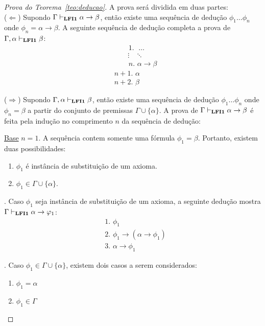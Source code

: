     \begin{proof}[Prova do Teorema~\ref{teo:deducao}] A prova será dividida em duas partes:\\
        ($\Longleftarrow$) Supondo $\Gamma \vdash_{\textbf{LFI1}{}} \alpha \to \beta$, então existe uma sequência de dedução $\phi_{1} \ldots \phi_{n}$ onde $\phi_{n} = \alpha \to \beta$. A seguinte sequência de dedução completa a prova de $\Gamma, \alpha \vdash_{\textbf{LFI1}{}} \beta$:
        \begin{align*}
            & \text{~~~~~~1. } \; \ldots\\
            & ~~~~~~\; \; \vdots \; \; \;\ddots\\
            & \text{~~~~~~$n$. } \alpha \to \beta\tag{Suposição}\\
            & \text{$n + 1$. } \alpha\tag{Premissa}\\
            & \text{$n + 2$. } \beta\tag{MP $n, n + 1$}
        \end{align*}

        \noindent  ($\Longrightarrow$) Supondo $\Gamma, \alpha \vdash_{\textbf{LFI1}{}} \beta$, então existe uma sequência de dedução $\phi_{1} \ldots \phi_{n}$ onde $\phi_{n} = \beta$ a partir do conjunto de premissas $\Gamma \cup \{\alpha\}$. A prova de $\Gamma \vdash_{\textbf{LFI1}{}} \alpha \to \beta$ é feita pela indução no comprimento $n$ da sequência de dedução:

        \noindent\underline{Base} $n = 1$.
        A sequência contem somente uma fórmula $\phi_{1} = \beta$. Portanto, existem duas possibilidades:
        \begin{enumerate}
            \item $\phi_{1}$ é instância de substituição de um axioma.
            \item $\phi_{1} \in \Gamma \cup \{\alpha\}$.
        \end{enumerate}

        . Caso $\phi_{1}$ seja instância de substituição de um axioma, a seguinte dedução mostra $\Gamma \vdash_{\textbf{LFI1}{}} \alpha \to \varphi_{1}$:
        \begin{align*}
            & \text{1. } \phi_{1} \tag{Instância de substituição de um axioma}\\
            & \text{2. } \phi_{1} \to (\alpha \to \phi_{1}) \tag{Ax1}\\
            & \text{3. } \alpha \to \phi_{1} \tag{MP 1,2}
        \end{align*}
        
        . Caso $\phi_{1} \in \Gamma \cup \{\alpha\}$, existem dois casos a serem considerados:
        \begin{enumerate}
            \item $\phi_{1} = \alpha$
            \item $\phi_{1} \in \Gamma$
        \end{enumerate}


\end{proof}
